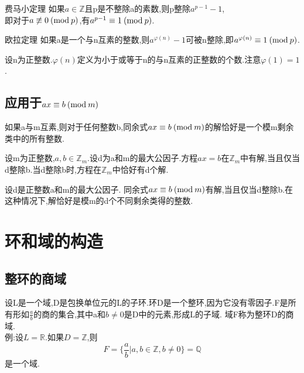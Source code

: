\documentclass[oneside,openany]{ctexbook}
\begin{document}
\begin{definition}{费马小定理}{}
如果$a\in \mathbb{Z}$且p是不整除a的素数,则p整除$a^{p-1}-1$,\\
即对于$a\not\equiv 0\>(\textnormal{mod}\>p)$,有$a^{p-1}\equiv 1\>(\textnormal{mod}\>p)$.
\end{definition}

\begin{definition}{欧拉定理}{}
如果a是一个与n互素的整数,则$a^{\varphi (n)}-1$可被n整除,即$a^{\varphi (n)}\equiv 1\>(\textnormal{mod}\>p)$.
\end{definition}

设n为正整数.$\varphi (n)$定义为小于或等于n的与n互素的正整数的个数.注意$\varphi (1)=1$.

\section{应用于$ax\equiv b\>(\textnormal{mod}\>m)$}

\begin{definition}{}{}
如果a与m互素,则对于任何整数b,同余式$ax\equiv b\>(\textnormal{mod}\>m)$的解恰好是一个模m剩余类中的所有整数.
\end{definition}

\begin{definition}{}{}
设m为正整数,$a,b\in \mathbb{Z}_m$.设d为a和m的最大公因子.方程$ax=b$在$\mathbb{Z}_m$中有解,当且仅当d整除b.当d整除b时,方程在$\mathbb{Z}_m$中恰好有d个解.
\end{definition}

\begin{definition}{}{}
设d是正整数a和m的最大公因子. 同余式$ax\equiv b\>(\textnormal{mod}\>m)$有解,当且仅当d整除b.在这种情况下,解恰好是模m的d个不同剩余类得的整数.
\end{definition}

\chapter{环和域的构造}

\section{整环的商域}
设L是一个域,D是包换单位元的L的子环.环D是一个整环,因为它没有零因子.F是所有形如$\frac{a}{b}$的商的集合,其中a和$b\neq 0$是D中的元素,形成L的子域.
域F称为整环D的商域.\\
例:设$L=\mathbb{R}$.如果$D=\mathbb{Z}$,则$$F=\{\frac{a}{b}|a,b\in \mathbb{Z},b\neq 0\}=\mathbb{Q}$$是一个域.
\end{document}
